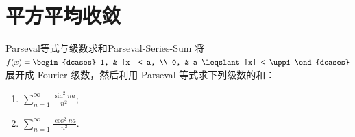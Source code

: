 \section{平方平均收敛}

\begin{problem}{Parseval等式与级数求和}{Parseval-Series-Sum}
    将 $f(x) = \begin{dcases} 1, & |x| < a, \\ 0, & a \leqslant |x| < \uppi \end{dcases}$ 展开成 Fourier 级数，然后利用 Parseval 等式求下列级数的和：
    \begin{enumerate}
        \item $\sum_{n=1}^{\infty} \frac{\sin^2 na}{n^2}$;
        \item $\sum_{n=1}^{\infty} \frac{\cos^2 na}{n^2}$.
    \end{enumerate}
\end{problem}


